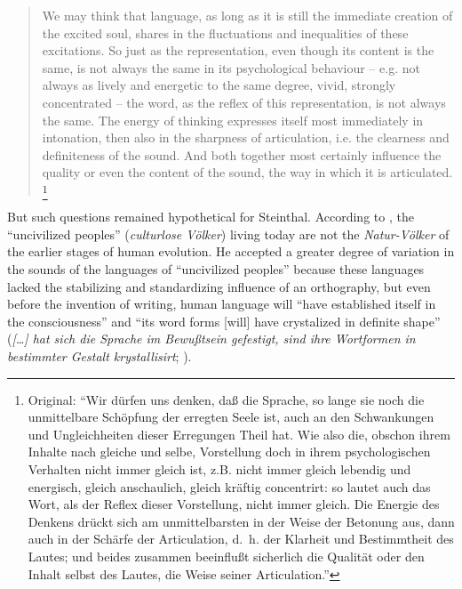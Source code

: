 \documentclass[output=paper]{langscibook}
\begin{document}
\begin{quotation}
We may think that language, as long as it is still the immediate creation of the excited soul, shares in the fluctuations and inequalities of these excitations. So just as the representation, even though its content is the same, is not always the same in its psychological behaviour -- e.g. not always as lively and energetic to the same degree, vivid, strongly concentrated -- the word, as the reflex of this representation, is not always the same. The energy of thinking expresses itself most immediately in intonation, then also in the sharpness of articulation, i.e. the clearness and definiteness of the sound. And both together most certainly influence the quality or even the content of the sound, the way in which it is articulated. \citep[3--4]{Steinthal1867}\footnote{Original: ``Wir dürfen uns denken, daß die Sprache, so lange sie noch die unmittelbare Schöpfung der erregten Seele ist, auch an den Schwankungen und Ungleichheiten dieser Erregungen Theil hat. Wie also die, obschon ihrem Inhalte nach gleiche und selbe, Vorstellung doch in ihrem psychologischen Verhalten nicht immer gleich ist, z.B. nicht immer gleich lebendig und energisch, gleich anschaulich, gleich kräftig concentrirt: so lautet auch das Wort, als der Reflex dieser Vorstellung, nicht immer gleich. Die Energie des Denkens drückt sich am unmittelbarsten in der Weise der Betonung aus, dann auch in der Schärfe der Articulation, d.~h. der Klarheit und Bestimmtheit des Lautes; und beides zusammen beeinflußt sicherlich die Qualität oder den Inhalt selbst des Lautes, die Weise seiner Articulation.''}
\end{quotation}

But such questions remained hypothetical for Steinthal. According to \citet[3--4]{Steinthal1867}, the ``uncivilized peoples'' (\emph{culturlose Völker}) living today are not the \emph{Natur-Völker} of the earlier stages of human evolution. He accepted a greater degree of variation in the sounds of the languages of ``uncivilized peoples'' because these languages lacked the stabilizing and standardizing influence of an orthography, but even before the invention of writing, human language will ``have established itself in the consciousness'' and ``its word forms [will] have crystalized in definite shape'' (\emph{[…] hat sich die Sprache im Bewußtsein gefestigt, sind ihre Wortformen in bestimmter Gestalt krystallisirt}; \citealt[4--5]{Steinthal1867}). 
\end{document}
